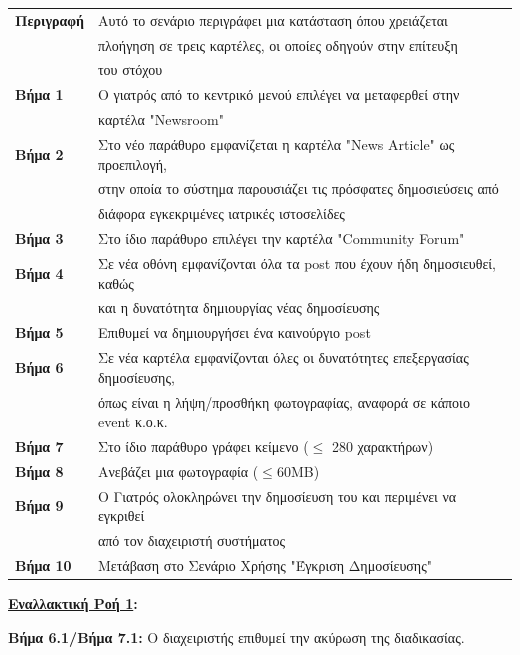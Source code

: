 \documentclass{article}
\newcommand\T{\rule{0pt}{2.6ex}}       %
\newcommand\B{\rule[-1.2ex]{0pt}{0pt}}
\begin{document}
 \begin{center}
     \begin{tabular}{|l|l|}
     \hline
      \textbf{Περιγραφή} & Αυτό το σενάριο περιγράφει μια κατάσταση όπου χρειάζεται \T \\& πλοήγηση σε τρεις καρτέλες, οι οποίες οδηγούν στην επίτευξη \\& του στόχου \B \\ 
      \hline
      \textbf{Βήμα 1} & Ο γιατρός από το κεντρικό μενού επιλέγει να μεταφερθεί στην \T \\& καρτέλα "Newsroom" \T\B \\
      \hline
      \textbf{Βήμα 2} & Στο νέο παράθυρο εμφανίζεται η καρτέλα "News Article" ως προεπιλογή, \T \\& στην οποία το σύστημα παρουσιάζει τις πρόσφατες δημοσιεύσεις από \\& διάφορα εγκεκριμένες ιατρικές ιστοσελίδες \B \\
      \hline
      \textbf{Βήμα 3} & Στο ίδιο παράθυρο επιλέγει την καρτέλα "Community Forum" \T\B \\
      \hline
      \textbf{Βήμα 4} & Σε νέα οθόνη εμφανίζονται όλα τα post που έχουν ήδη δημοσιευθεί, καθώς \T \\& και η δυνατότητα δημιουργίας νέας δημοσίευσης \B \\
      \hline
      \textbf{Βήμα 5} & Επιθυμεί να δημιουργήσει ένα καινούργιο post \T\B \\
      \hline
      \textbf{Βήμα 6} & Σε νέα καρτέλα εμφανίζονται όλες οι δυνατότητες επεξεργασίας δημοσίευσης,\T \\& όπως είναι η λήψη/προσθήκη φωτογραφίας, αναφορά σε κάποιο event κ.ο.κ. \B \\
      \hline
      \textbf{Βήμα 7} & Στο ίδιο παράθυρο γράφει κείμενο ($\le$ 280 χαρακτήρων) \T\B \\
      \hline
      \textbf{Βήμα 8} & Ανεβάζει μια φωτογραφία ($\le$60MB) \T\B \\
      \hline
      \textbf{Βήμα 9} & Ο Γιατρός ολοκληρώνει την δημοσίευση του και περιμένει να εγκριθεί \T \\& από τον διαχειριστή συστήματος \B \\
      \hline      
       \textbf{Βήμα 10} & Μετάβαση στο Σενάριο Χρήσης "Έγκριση Δημοσίευσης"\T\B \\
      \hline
     \end{tabular}
 \end{center}
 
\textbf{\underline{Εναλλακτική Ροή 1}:} \vspace{0.2cm}
\par \textbf{Βήμα 6.1/Βήμα 7.1:} Ο διαχειριστής επιθυμεί την ακύρωση της διαδικασίας.
\end{document}
